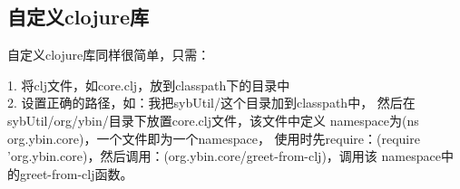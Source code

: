 ﻿\documentclass[a4paper,11pt]{article}
\begin{document}
  \subsection[自定义clojure库]{自定义clojure库}
  自定义clojure库同样很简单，只需：

  1. 将clj文件，如core.clj，放到classpath下的目录中\\
  2. 设置正确的路径，如：我把sybUtil/这个目录加到classpath中，
  然后在sybUtil/org/ybin/目录下放置core.clj文件，该文件中定义
  namespace为(ns org.ybin.core)，一个文件即为一个namespace，
  使用时先require：(require 'org.ybin.core)，然后调用：(org.ybin.core/greet-from-clj)，调用该
  namespace中的greet-from-clj函数。

      
\end{document}
